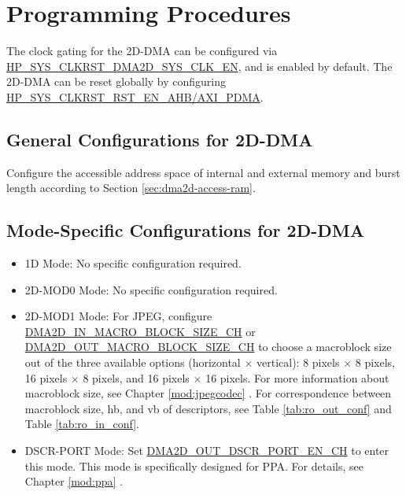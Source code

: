 \documentclass[main\_\_EN.tex]{subfiles}
\begin{document}

\section{Programming Procedures}
\label{sec:2ddma-prog-procedures}

The clock gating for the 2D-DMA can be configured via \hyperref[fielddesc:HPSYSCLKRSTDMA2DSYSCLKEN]{HP\_SYS\_CLKRST\_DMA2D\_SYS\_CLK\_EN}, and is enabled by default. The 2D-DMA can be reset globally by configuring \hyperref[fielddesc:HPSYSCLKRSTRSTENAHBPDMA]{HP\_SYS\_CLKRST\_RST\_EN\_AHB/AXI\_PDMA}.

\subsection{General Configurations for 2D-DMA}


Configure the accessible address space of internal and external memory and burst length according to Section \ref{sec:dma2d-access-ram}.


\subsection{Mode-Specific Configurations for 2D-DMA}

\begin{itemize}
\item 1D Mode: No specific configuration required.
\item 2D-MOD0 Mode: No specific configuration required.
\item 2D-MOD1 Mode: For JPEG, configure \hyperref[fielddesc:DMA2DINMACROBLOCKSIZECHN]{DMA2D\_IN\_MACRO\_BLOCK\_SIZE\_CH} or \hyperref[fielddesc:DMA2DOUTMACROBLOCKSIZECHN]{DMA2D\_OUT\_MACRO\_BLOCK\_SIZE\_CH} to choose a macroblock size out of the three available options (horizontal $\times$ vertical): 8 pixels $\times$ 8 pixels, 16 pixels $\times$ 8 pixels, and 16 pixels $\times$ 16 pixels. For more information about macroblock size, see Chapter \ref{mod:jpegcodec} \textit{}. For correspondence between macroblock size, hb, and vb of descriptors, see Table \ref{tab:ro_out_conf} and Table \ref{tab:ro_in_conf}.
\item DSCR-PORT Mode: Set \hyperref[fielddesc:DMA2DOUTDSCRPORTENCHN]{DMA2D\_OUT\_DSCR\_PORT\_EN\_CH} to enter this mode. This mode is specifically designed for PPA. For details, see Chapter \ref{mod:ppa} \textit{}.
\end{itemize}
\end{document}

